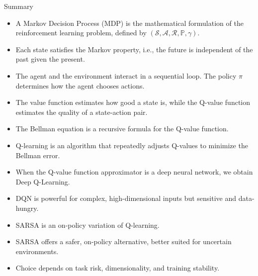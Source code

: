 \begin{frame}[allowframebreaks]{Summary}
    \begin{itemize}
        \setlength{\itemsep}{1em}
        \item A Markov Decision Process (MDP) is the mathematical formulation of the reinforcement learning problem, defined by $\left ( \mathcal{S},\mathcal{A},\mathcal{R}, \mathbb{P}, \gamma \right )$.
        \item Each state satisfies the Markov property, i.e., the future is independent of the past given the present.
        \item The agent and the environment interact in a sequential loop. The policy $\pi$ determines how the agent chooses actions.
        \item The value function estimates how good a state is, while the Q-value function estimates the quality of a state-action pair.
        \item The Bellman equation is a recursive formula for the Q-value function.
        \item Q-learning is an algorithm that repeatedly adjusts Q-values to minimize the Bellman error.
        \item When the Q-value function approximator is a deep neural network, we obtain Deep Q-Learning.
        \item DQN is powerful for complex, high-dimensional inputs but sensitive and data-hungry.
        \item SARSA is an on-policy variation of Q-learning.
        \item SARSA offers a safer, on-policy alternative, better suited for uncertain environments.
        \item Choice depends on task risk, dimensionality, and training stability.
    \end{itemize}
\end{frame}